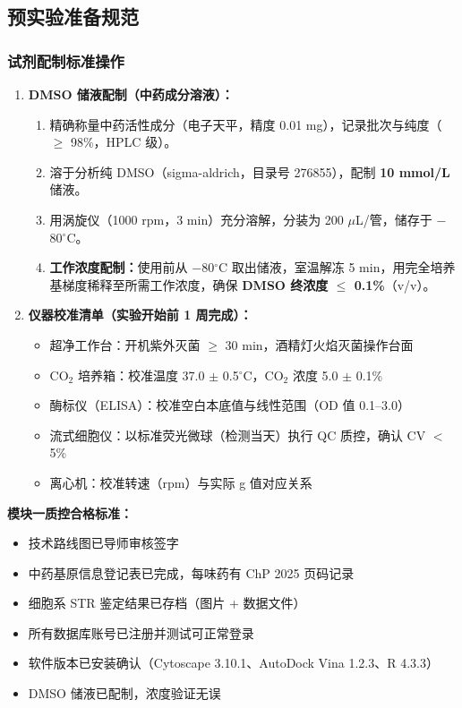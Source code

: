 \documentclass[12pt,a4paper,twoside]{article}
\begin{document}
\subsection{预实验准备规范}
\label{sec:module1_pilot}

\subsubsection{试剂配制标准操作}

\begin{enumerate}
  \item \textbf{DMSO 储液配制（中药成分溶液）：}
    \begin{enumerate}
      \item 精确称量中药活性成分（电子天平，精度 0.01 mg），记录批次与纯度（$\geq$ 98\%，HPLC 级）。
      \item 溶于分析纯 DMSO（sigma-aldrich，目录号 276855），配制 \textbf{10 mmol/L} 储液。
      \item 用涡旋仪（1000 rpm，3 min）充分溶解，分装为 200 $\mu$L/管，储存于 $-$80$^{\circ}$C。
      \item \textbf{工作浓度配制：}使用前从 $-$80$^{\circ}$C 取出储液，室温解冻 5 min，用完全培养基梯度稀释至所需工作浓度，确保 \textbf{DMSO 终浓度 $\leq$ 0.1\%}（v/v）。
    \end{enumerate}

  \item \textbf{仪器校准清单（实验开始前 1 周完成）：}
    \begin{itemize}
      \item 超净工作台：开机紫外灭菌 $\geq$ 30 min，酒精灯火焰灭菌操作台面
      \item CO$_2$ 培养箱：校准温度 37.0 $\pm$ 0.5$^{\circ}$C，CO$_2$ 浓度 5.0 $\pm$ 0.1\%
      \item 酶标仪（ELISA）：校准空白本底值与线性范围（OD 值 0.1--3.0）
      \item 流式细胞仪：以标准荧光微球（检测当天）执行 QC 质控，确认 CV $<$ 5\%
      \item 离心机：校准转速（rpm）与实际 g 值对应关系
    \end{itemize}
\end{enumerate}

\begin{qcbox}
\textbf{模块一质控合格标准：}
\begin{itemize}
  \item 技术路线图已导师审核签字 
  \item 中药基原信息登记表已完成，每味药有 ChP 2025 页码记录 
  \item 细胞系 STR 鉴定结果已存档（图片 + 数据文件）
  \item 所有数据库账号已注册并测试可正常登录 
  \item 软件版本已安装确认（Cytoscape 3.10.1、AutoDock Vina 1.2.3、R 4.3.3）
  \item DMSO 储液已配制，浓度验证无误 
\end{itemize}
\end{qcbox}
\end{document}
